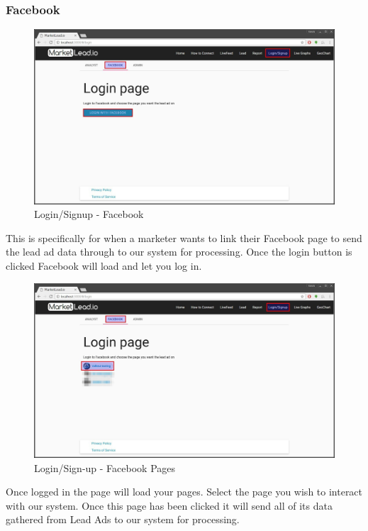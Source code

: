 \documentclass{article}
\begin{document}
			\subsubsection{Facebook}
				\begin{figure}[H]
					\includegraphics[width=\textwidth]{images/login_signup_facebook.jpg}
					\caption{Login/Signup - Facebook}
					\label{fig:loginSignupFacebook}
				\end{figure}
				This is specifically for when a marketer wants to link their Facebook page to send the lead ad data through to our system for processing.
				Once the login button is clicked Facebook will load and let you log in.\\

				\begin{figure}[H]
					\includegraphics[width=\textwidth]{images/login_signup_facebook_pages.jpg}
					\caption{Login/Sign-up - Facebook Pages}
					\label{fig:loginSignupFacebookPages}
				\end{figure}
				Once logged in the page will load your pages. Select the page you wish to interact with our system.
				Once this page has been clicked it will send all of its data gathered from Lead Ads to our system for processing.
\end{document}
